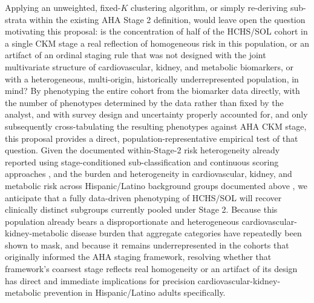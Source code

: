 \documentclass[11pt]{article}
\begin{document}
Applying an unweighted, fixed-$K$ clustering algorithm, or simply re-deriving sub-strata within the existing AHA Stage 2 definition, would leave open the question motivating this proposal: is the concentration of half of the HCHS/SOL cohort in a single CKM stage a real reflection of homogeneous risk in this population, or an artifact of an ordinal staging rule that was not designed with the joint multivariate structure of cardiovascular, kidney, and metabolic biomarkers, or with a heterogeneous, multi-origin, historically underrepresented population, in mind? By phenotyping the entire cohort from the biomarker data directly, with the number of phenotypes determined by the data rather than fixed by the analyst, and with survey design and uncertainty properly accounted for, and only subsequently cross-tabulating the resulting phenotypes against AHA CKM stage, this proposal provides a direct, population-representative empirical test of that question. Given the documented within-Stage-2 risk heterogeneity already reported using stage-conditioned sub-classification and continuous scoring approaches \citep{tian2026riskbased,masoumi2026severity}, and the burden and heterogeneity in cardiovascular, kidney, and metabolic risk across Hispanic/Latino background groups documented above \citep{heiss2014prevalence,ricardo2015prevalence,lopezgolden2014disparities}, we anticipate that a fully data-driven phenotyping of HCHS/SOL will recover clinically distinct subgroups currently pooled under Stage 2. Because this population already bears a disproportionate and heterogeneous cardiovascular-kidney-metabolic disease burden that aggregate categories have repeatedly been shown to mask, and because it remains underrepresented in the cohorts that originally informed the AHA staging framework, resolving whether that framework's coarsest stage reflects real homogeneity or an artifact of its design has direct and immediate implications for precision cardiovascular-kidney-metabolic prevention in Hispanic/Latino adults specifically.
\end{document}
